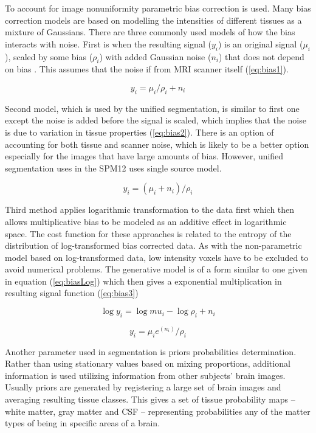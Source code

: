 \documentclass[12pt]{article}
\begin{document}
To account for image nonuniformity parametric bias correction is used. Many bias correction models are based on modelling the intensities of different tissues as a mixture of Gaussians. There are three commonly used models of how the bias interacts with noise. First is when the resulting signal ($y_i$) is an original signal ($\mu_i$), scaled by some bias ($\rho_i$) with added Gaussian noise ($n_i$) that does not depend on bias \cite{shattuck2001magnetic}. This assumes that the noise if from MRI scanner itself (\ref{eq:bias1}).

\begin{equation}
\label{eq:bias1}
y_i=\mu_i/\rho_i+n_i
\end{equation}

Second model, which is used by the unified segmentation, is similar to first one except the noise is added before the signal is scaled, which implies that the noise is due to variation in tissue properties (\ref{eq:bias2}). There is an option of accounting for both tissue and scanner noise, which is likely to be a better option especially for the images that have large amounts of bias. However, unified segmentation uses in the SPM12 uses single source model.

\begin{equation}
\label{eq:bias2}
y_i=(\mu_i+n_i)/\rho_i
\end{equation}

Third method applies logarithmic transformation to the data first which then allows multiplicative bias to be modeled as an additive effect in logarithmic space. The cost function for these approaches is related to the entropy of the distribution of log-transformed bias corrected data. As with the non-parametric model based on log-transformed data, low intensity voxels have to be excluded to avoid numerical problems. The generative model is of a form similar to one given in equation (\ref{eq:biasLog}) which then gives a exponential multiplication in resulting signal function (\ref{eq:bias3})

\begin{equation}
\label{eq:biasLog}
\log y_i = \log mu_i - \log \rho_i + n_i
\end{equation}

\begin{equation}
\label{eq:bias3}
y_i = \mu_i e^(n_i) / \rho_i
\end{equation}

Another parameter used in segmentation is priors probabilities determination. Rather than using stationary values based on mixing proportions, additional information is used utilizing information from other subjects’ brain images. Usually priors are generated by registering a large set of brain images and averaging resulting tissue classes. This gives a set of tissue probability maps – white matter, gray matter and CSF – representing probabilities any of the matter types of being in specific areas of a brain.
\end{document}
